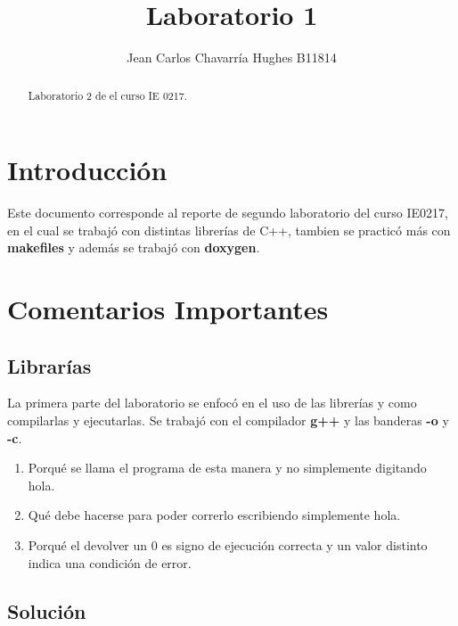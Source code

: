 \documentclass{article}
\begin{document}
\title{Laboratorio 1}
\author{Jean Carlos Chavarr\' ia Hughes B11814}
\maketitle
\begin{abstract}
Laboratorio 2 de el curso IE 0217.
\end{abstract}
\section{Introducci\' on}
Este documento corresponde al reporte de segundo laboratorio del curso IE0217, en el cual se trabaj\' o con distintas librer\' ias de C++, tambien se practic\' o m\' as con \textbf{makefiles} y adem\' as se trabaj\' o con \textbf{doxygen}.

\section{Comentarios Importantes}

\subsection*{Librar\' ias}

La primera parte del laboratorio se enfoc\' o en el uso de las librer\' ias y como compilarlas y ejecutarlas. Se trabaj\' o con el compilador \textbf{g++} y las banderas \textbf{-o} y \textbf{-c}. 

\bigskip

\begin{enumerate}
\item  Porqu\' e se llama el programa de esta manera y no simplemente digitando hola.
\item  Qu\' e debe hacerse para poder correrlo escribiendo simplemente hola.
\item  Porqu\' e el devolver un 0 es signo de ejecuci\' on correcta y un valor distinto indica una condici\' on de error.

\end{enumerate}

\subsection*{Soluci\' on}
\end{document}
